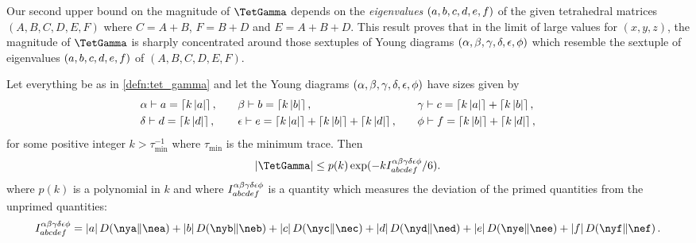 \documentclass[notitlepage, 10pt]{article}
\begin{document}
Our second upper bound on the magnitude of $\TetGamma$ depends on the \textit{eigenvalues} $(a,b,c,d,e,f)$ of the given tetrahedral matrices $(A, B, C, D, E, F)$ where $C=A+B$, $F=B+D$ and $E=A+B+D$.
This result proves that in the limit of large values for $(x,y,z)$, the magnitude of $\TetGamma$ is sharply concentrated around those sextuples of Young diagrams $(\alpha,\beta,\gamma,\delta,\epsilon,\phi)$ which resemble the sextuple of eigenvalues $(a,b,c,d,e,f)$ of $(A,B,C,D,E,F)$.
\begin{thm}
    \label{thm:abd_dep_upper_bound}
    Let everything be as in \cref{defn:tet_gamma} and let the Young diagrams $(\alpha,\beta,\gamma,\delta,\epsilon,\phi)$ have sizes given by
    \begin{equation}
        \label{eq:ceil_yd_sizes}
        \begin{alignedat}{3}
            &\alpha \vdash a = \left\lceil k\left|a\right|\right\rceil, \qquad 
            &&\beta \vdash b = \left\lceil k\left|b\right|\right\rceil, \qquad
            &&\gamma \vdash c = \left\lceil k\left|a\right|\right\rceil+\left\lceil k\left|b\right|\right\rceil, \qquad\\
            &\delta \vdash d = \left\lceil k\left|d\right|\right\rceil, \qquad
            &&\epsilon \vdash e = \left\lceil k\left|a\right|\right\rceil+\left\lceil k\left|b\right|\right\rceil+\left\lceil k\left|d\right|\right\rceil, \qquad
            &&\phi \vdash f = \left\lceil k\left|b\right|\right\rceil+\left\lceil k\left|d\right|\right\rceil,
        \end{alignedat}
    \end{equation}
    for some positive integer $k > \tau_{\min}^{-1}$ where $\tau_{\min}$ is the minimum trace.
    Then
    \begin{equation}
        \abs{\TetGamma} 
        \leq p(k) \exp(-k I^{\ya\yb\yc\yd\ye\yf}_{\ea\eb\ec\ed\ee\ef}/6).
        \label{eq:tet_gamma_upper_bound}
    \end{equation}
    where $p(k)$ is a polynomial in $k$ and where $I^{\alpha\beta\gamma\delta\epsilon\phi}_{abcdef}$ is a quantity which measures the deviation of the primed quantities from the unprimed quantities:
    \begin{equation}
        I^{\ya\yb\yc\yd\ye\yf}_{\ea\eb\ec\ed\ee\ef}
        =\abs{\ea} \kl{\nya}{\nea}
        +\abs{\eb} \kl{\nyb}{\neb}
        +\abs{\ec} \kl{\nyc}{\nec}
        +\abs{\ed} \kl{\nyd}{\ned}
        +\abs{\ee} \kl{\nye}{\nee}
        +\abs{\ef} \kl{\nyf}{\nef}.
    \end{equation}
\end{thm}
\end{document}
